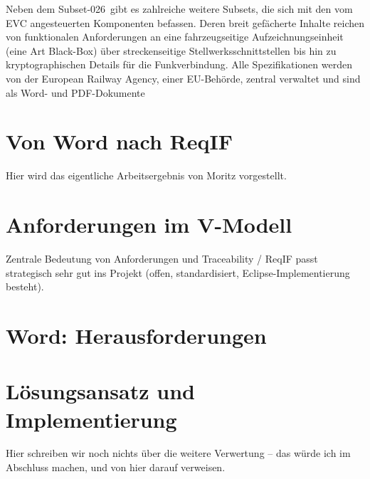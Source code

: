 \documentclass[twoside]{article}
\begin{document}
\begin{multicols}{2}
Neben dem \glqq Subset-026\grqq\ gibt es zahlreiche weitere Subsets, die sich mit den vom EVC angesteuerten Komponenten befassen. Deren breit gefächerte Inhalte reichen von funktionalen Anforderungen an eine fahrzeugseitige Aufzeichnungseinheit (eine Art \glqq Black-Box\grqq ) über streckenseitige Stellwerksschnittstellen bis hin zu kryptographischen Details für die Funkverbindung. Alle Spezifikationen werden von der European Railway Agency, einer EU-Behörde, zentral verwaltet und sind als Word- und PDF-Dokumente 

\section{Von Word nach ReqIF}

Hier wird das eigentliche Arbeitsergebnis von Moritz vorgestellt.

\section{Anforderungen im V-Modell}

Zentrale Bedeutung von Anforderungen und Traceability / ReqIF passt strategisch sehr gut ins Projekt (offen, standardisiert, Eclipse-Implementierung besteht).

\section{Word: Herausforderungen}

\section{Lösungsansatz und Implementierung}

Hier schreiben wir noch nichts über die weitere Verwertung – das würde ich im Abschluss machen, und von hier darauf verweisen.


\end{multicols}
\end{document}
